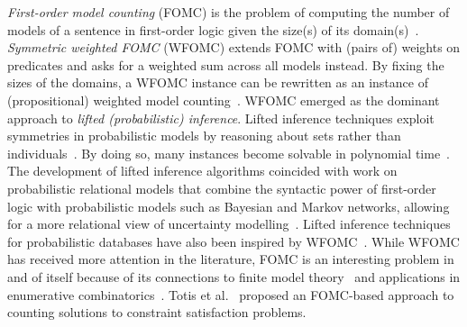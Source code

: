 \documentclass{article}
\begin{document}

\emph{First-order model counting} (FOMC) is the problem of computing the number
of models of a sentence in first-order logic given the size(s) of its
domain(s)~\cite{DBLP:conf/pods/BeameBGS15}. \emph{Symmetric weighted FOMC}
(WFOMC) extends FOMC with (pairs of) weights on predicates and asks for a
weighted sum across all models instead. By fixing the sizes of the domains, a
WFOMC instance can be rewritten as an instance of (propositional) weighted model
counting~\cite{DBLP:journals/ai/ChaviraD08}. WFOMC emerged as the dominant
approach to \emph{lifted (probabilistic) inference}. Lifted inference techniques
exploit symmetries in probabilistic models by reasoning about sets rather than
individuals~\cite{DBLP:conf/ecai/Kersting12}. By doing so, many instances become
solvable in polynomial time~\cite{DBLP:conf/nips/Broeck11}. The development of
lifted inference algorithms coincided with work on probabilistic relational
models that combine the syntactic power of first-order logic with probabilistic
models such as Bayesian and Markov networks, allowing for a more relational view
of uncertainty
modelling~\cite{DBLP:series/synthesis/2016Raedt,DBLP:journals/ml/KimmigMG15,DBLP:journals/ml/RichardsonD06}.
Lifted inference techniques for probabilistic databases have also been inspired
by
WFOMC~\cite{DBLP:journals/pvldb/GatterbauerS15,DBLP:journals/debu/GribkoffSB14}.
While WFOMC has received more attention in the literature, FOMC is an
interesting problem in and of itself because of its connections to finite model
theory~\cite{DBLP:conf/kr/BremenK21} and applications in enumerative
combinatorics~\cite{DBLP:conf/ilp/BarvinekB0ZK21}. Totis et
al.~ proposed an FOMC-based approach to
counting solutions to constraint satisfaction problems.

\end{document}
